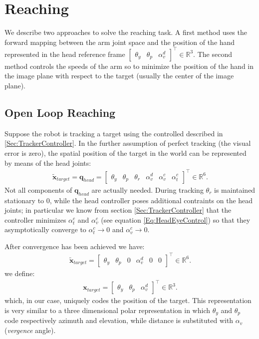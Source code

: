 \section{Reaching}
\label{sec:reaching}

We describe two approaches to solve the reaching task. A first method 
uses the forward mapping between the arm joint space and the position 
of the hand represented in the head reference frame $\begin{bmatrix} 
\theta_y & \theta_p & \alpha_v^d\end{bmatrix}^\top \in \mathbb R^3$. 
The second method controls the speeds of the arm so to minimize the position 
of the hand in the image plane with respect to the target (usually the 
center of the image plane).

\subsection{Open Loop Reaching}
Suppose the robot is tracking a target using the controlled described in 
\ref{Sec:TrackerController}. In the further assumption of perfect tracking 
(the visual error is zero), the spatial position of the target
in the world can be represented by means of the head joints:
%
\begin{eqnarray*}
\tilde {\mathbf x}_{target}= \mathbf q_{head} =
\begin{bmatrix} \theta_y & \theta_p & \theta_r & \alpha_v^d & \alpha_v^c & \alpha_t^c \end{bmatrix}^\top \in \mathbb R^6.
\end{eqnarray*}
%
Not all components of $\mathbf q_{head}$ are actually needed. During tracking 
$\theta_r$ is maintained stationary to 0, while the head controller 
poses additional contraints on the head joints; in particular we know from section 
\ref{Sec:TrackerController} that the controller minimizes $\alpha_t^c$ and
$\alpha^c_v$ (see equation \ref{Eq:HeadEyeControl}) so that they asymptotically
converge to $\alpha_t^c \rightarrow 0$ and $\alpha_v^c \rightarrow 0$. 

After convergence has been achieved we have:
%
\begin{eqnarray*}
\tilde {\mathbf x}_{target}=
\begin{bmatrix} \theta_y & \theta_p & 0 & \alpha_v^d & 0 & 0 \end{bmatrix}^\top \in \mathbb R^6.
\end{eqnarray*}
%
we define:
%
\begin{eqnarray*}
\mathbf x_{target}=
\begin{bmatrix} \theta_y & \theta_p & \alpha_v^d\end{bmatrix}^\top \in \mathbb R^3.
\end{eqnarray*}
%
which, in our case, uniquely codes the position of the target. This representation is very similar 
to a three dimensional polar representation in which $\theta_y$ and $\theta_p$ code respectively 
azimuth and elevation, while distance is substituted with $\alpha_v$ (\emph{vergence} angle). 

